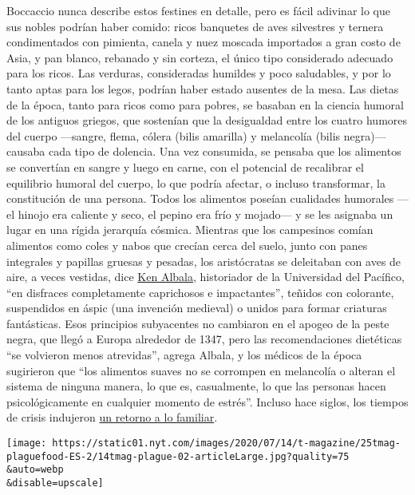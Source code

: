 Boccaccio nunca describe estos festines en detalle, pero es fácil
adivinar lo que sus nobles podrían haber comido: ricos banquetes de aves
silvestres y ternera condimentados con pimienta, canela y nuez moscada
importados a gran costo de Asia, y pan blanco, rebanado y sin corteza,
el único tipo considerado adecuado para los ricos. Las verduras,
consideradas humildes y poco saludables, y por lo tanto aptas para los
legos, podrían haber estado ausentes de la mesa. Las dietas de la época,
tanto para ricos como para pobres, se basaban en la ciencia humoral de
los antiguos griegos, que sostenían que la desigualdad entre los cuatro
humores del cuerpo ---sangre, flema, cólera (bilis amarilla) y
melancolía (bilis negra)--- causaba cada tipo de dolencia. Una vez
consumida, se pensaba que los alimentos se convertían en sangre y luego
en carne, con el potencial de recalibrar el equilibrio humoral del
cuerpo, lo que podría afectar, o incluso transformar, la constitución de
una persona. Todos los alimentos poseían cualidades humorales ---el
hinojo era caliente y seco, el pepino era frío y mojado--- y se les
asignaba un lugar en una rígida jerarquía cósmica. Mientras que los
campesinos comían alimentos como coles y nabos que crecían cerca del
suelo, junto con panes integrales y papillas gruesas y pesadas, los
aristócratas se deleitaban con aves de aire, a veces vestidas, dice
\href{https://www.pacific.edu/academics/schools-and-colleges/college-of-the-pacific/academics/departments-and-programs/history/faculty-directory/ken-albala.html}{Ken
Albala}, historiador de la Universidad del Pacífico, ``en disfraces
completamente caprichosos e impactantes'', teñidos con colorante,
suspendidos en áspic (una invención medieval) o unidos para formar
criaturas fantásticas. Esos principios subyacentes no cambiaron en el
apogeo de la peste negra, que llegó a Europa alrededor de 1347, pero las
recomendaciones dietéticas ``se volvieron menos atrevidas'', agrega
Albala, y los médicos de la época sugirieron que ``los alimentos suaves
no se corrompen en melancolía o alteran el sistema de ninguna manera, lo
que es, casualmente, lo que las personas hacen psicológicamente en
cualquier momento de estrés''. Incluso hace siglos, los tiempos de
crisis indujeron
\href{https://www.nytimes.com/2020/04/07/business/coronavirus-processed-foods.html}{un
retorno a lo familiar}.

\texttt{[image: https://static01.nyt.com/images/2020/07/14/t-magazine/25tmag-plaguefood-ES-2/14tmag-plague-02-articleLarge.jpg?quality=75\\\&auto=webp\\\&disable=upscale]}

